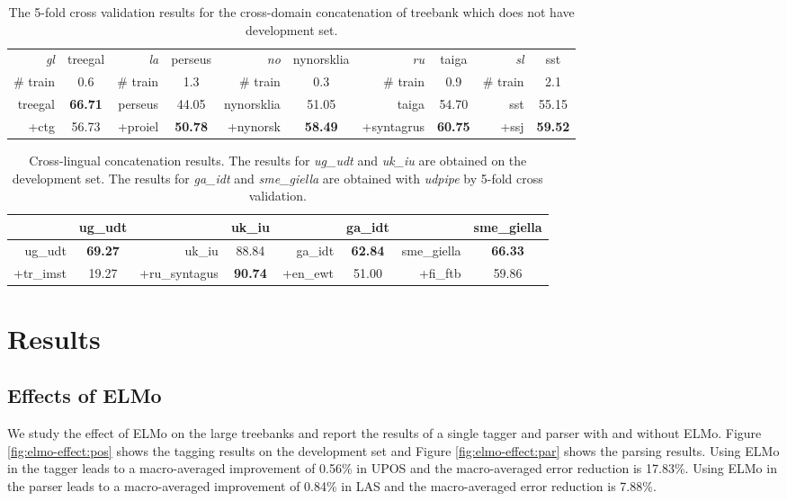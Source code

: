 \documentclass[11pt,a4paper]{article}
\begin{document}
\begin{table*}[t]
	\centering
	\small
	\begin{tabular}{rc || rc || rc || rc || rc}
		\textit{gl} & treegal & \textit{la} & perseus & \textit{no} & nynorsklia & \textit{ru} & taiga & \textit{sl} & sst \\
		\# train & 0.6 & \# train & 1.3 & \# train & 0.3 & \# train & 0.9 & \# train & 2.1 \\
		\hline
		treegal & \textbf{66.71} & perseus & 44.05 & nynorsklia & 51.05 & taiga & 54.70 & sst & 55.15 \\
		+ctg & 56.73 & +proiel & \textbf{50.78} & +nynorsk & \textbf{58.49} & +syntagrus & \textbf{60.75} & +ssj & \textbf{59.52} \\
	\end{tabular}
	\caption{The 5-fold cross validation results for the cross-domain concatenation of treebank which does not have development set.}\label{tbl:confuse-mat2}
\end{table*}
\begin{table*}[t]
	\centering
	\small
\begin{tabular}{rc || rc || rc || rc}
		& ug\_udt  &  & uk\_iu & & ga\_idt & & sme\_giella \\
		\hline
		ug\_udt & \textbf{69.27} & uk\_iu & 88.84 & ga\_idt & \textbf{62.84} & sme\_giella & \textbf{66.33}\\
		+tr\_imst & 19.27 & +ru\_syntagus & \textbf{90.74} & +en\_ewt &51.00 & +fi\_ftb & 59.86\\
	\end{tabular}
	\caption{Cross-lingual concatenation results. 
		The results for \textit{ug\_udt} and \textit{uk\_iu} are obtained on the development set.
		The results for \textit{ga\_idt} and \textit{sme\_giella} are obtained with \textit{udpipe} by 5-fold cross validation.}\label{tbl:cross-ling-concat}
\end{table*}

\section{Results}

\subsection{Effects of ELMo}

We study the effect of ELMo on the large treebanks and report
the results of a single tagger and parser with and without ELMo.
Figure \ref{fig:elmo-effect:pos} shows the tagging results on the development set
and Figure \ref{fig:elmo-effect:par}
shows the parsing results.
Using ELMo in the tagger leads to a macro-averaged improvement of 0.56\% in UPOS
and the macro-averaged error reduction is 17.83\%.
Using ELMo in the parser leads to a macro-averaged improvement 
of 0.84\% in LAS and
the macro-averaged error reduction is 7.88\%.
\end{document}
